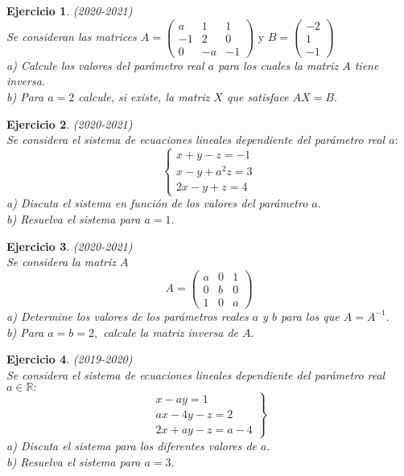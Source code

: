 \documentclass[12pt, a4paper]{amsart}
\newtheorem{ejer}{Ejercicio}
\begin{document}
\begin{ejer}\em (2020-2021)\\
Se consideran las matrices $A=\begin{pmatrix}
a & 1 & 1
\\ -1 & 2 & 0
\\ 0 & -a & -1
\end{pmatrix} \text{ y } B=\begin{pmatrix}
-2
\\ 1
\\ -1
\end{pmatrix}$\\
a) Calcule los valores del parámetro real $a$ para los cuales la matriz $A$ tiene inversa.\\
b) Para $a = 2$ calcule, si existe, la matriz $X$ que satisface $AX = B .$
\end{ejer}

\begin{ejer}\em (2020-2021)\\
Se considera el sistema de ecuaciones lineales dependiente del parámetro real $a:$
\[
\left \{ \begin{matrix}
x+y-z=-1
\\ x-y+a^2z=3
\\  2x-y+z=4
\end{matrix}  \right.
\]
a) Discuta el sistema en función de los valores del parámetro $a.$\\
b) Resuelva el sistema para $a = 1.$
\end{ejer}

\begin{ejer}\em (2020-2021)\\
Se considera la matriz $A$
\[
A=\begin{pmatrix}
a & 0 & 1
\\ 0 & b & 0
\\ 1 & 0 & a
\end{pmatrix}
\]
a) Determine los valores de los parámetros reales $a$ y $b$ para los que $A = A^{-1}.$\\
b) Para $a = b = 2,$ calcule la matriz inversa de $A.$
\end{ejer}

\begin{ejer}\em (2019-2020)\\
Se considera el sistema de ecuaciones lineales dependiente del parámetro real $a\in\mathbb{R}:$
\[
\left. \begin{matrix}
x-ay=1
\\ ax-4y-z=2
\\  2x+ay-z=a-4
\end{matrix}  \right \}
\]
a) Discuta el sistema para los diferentes valores de $a .$\\
b) Resuelva el sistema para $a = 3.$
\end{ejer}
\end{document}
